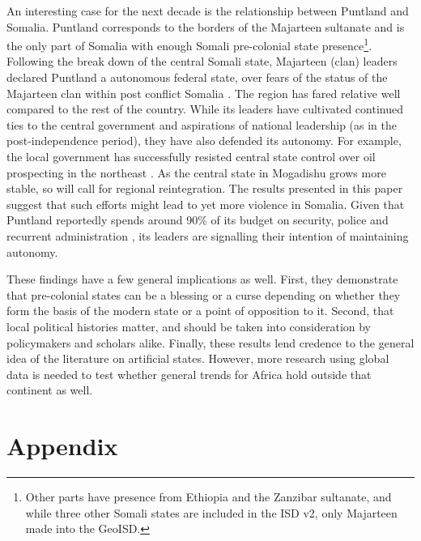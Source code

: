 \documentclass[12pt]{article}
\begin{document}
An interesting case for the next decade is the relationship between Puntland and
Somalia. Puntland corresponds to the borders of the Majarteen sultanate and is
the only part of Somalia with enough Somali pre-colonial state
presence\footnote{Other parts have presence from Ethiopia and the Zanzibar
sultanate, and while three other Somali states are included in the ISD v2, only
Majarteen made into the GeoISD.}. Following the break down of the central
Somali state, Majarteen (clan) leaders declared Puntland a autonomous federal
state, over fears of the status of the Majarteen clan within post conflict
Somalia \citep{Johnson_2014}. The region has fared relative well compared to the
rest of the country. While its leaders have cultivated continued ties to the
central government and aspirations of national leadership (as in the
post-independence period), they have also defended its autonomy. For example,
the local government has successfully resisted central state control over oil
prospecting in the northeast \citep{Johnson_2014}. As the central state in
Mogadishu grows more stable, so will call for regional reintegration. The
results presented in this paper suggest that such efforts might lead to yet more
violence in Somalia. Given that Puntland reportedly spends around 90\% of its
budget on security, police and recurrent administration \citep{Johnson_2014},
its leaders are signalling their intention of maintaining autonomy.

These findings have a few general implications as well. First, they demonstrate
that pre-colonial states can be a blessing or a curse depending on whether they
form the basis of the modern state or a point of opposition to it. Second, that
local political histories matter, and should be taken into consideration by
policymakers and scholars alike. Finally, these results lend credence to the
general idea of the literature on artificial states. However, more research
using global data is needed to test whether general trends for Africa hold
outside that continent as well.


\pagebreak




\pagebreak
\section*{Appendix}











\end{document}
